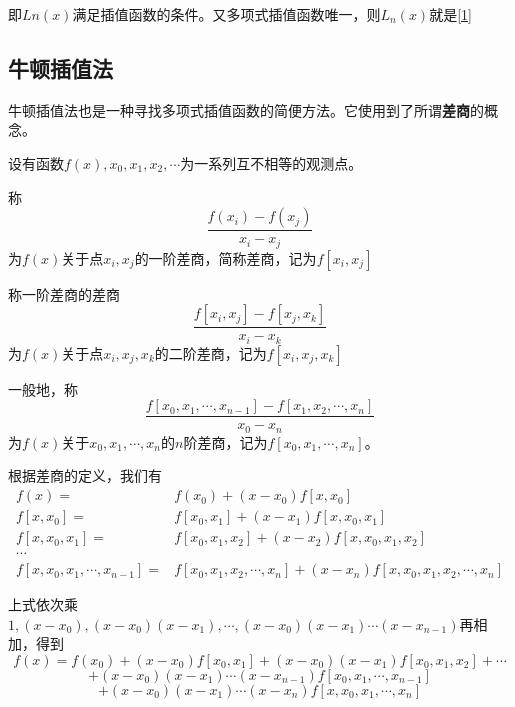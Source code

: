 \documentclass[withoutpreface]{cumcmthesis}
\begin{document}
即$Ln(x)$满足插值函数的条件。又多项式插值函数唯一，则$L_n(x)$就是\cref{1}

\subsection{牛顿插值法}

牛顿插值法也是一种寻找多项式插值函数的简便方法。它使用到了所谓\textbf{差商}的概念。

\begin{definition}[差商]
    设有函数$f(x),x_0,x_1,x_2,\cdots$为一系列互不相等的观测点。

    称\begin{equation*}
        \frac{f(x_i)-f(x_j)}{x_i-x_j}
    \end{equation*}为$f(x)$关于点$x_i,x_j$的一阶差商，简称差商，记为$f[x_i,x_j]$

    称一阶差商的差商\begin{equation*}
        \frac{f[x_i,x_j]-f[x_j,x_k]}{x_i-x_k}
    \end{equation*}为$f(x)$关于点$x_i,x_j,x_k$的二阶差商，记为$f[x_i,x_j,x_k]$

    一般地，称
    \begin{equation*}
        \frac{f[x_0,x_1,\cdots,x_{n-1}]-f[x_1,x_2,\cdots,x_n]}{x_0-x_n}
    \end{equation*}
    为$f(x)$关于$x_0,x_1,\cdots,x_n$的$n$阶差商，记为$f[x_0,x_1,\cdots,x_n]$。
\end{definition}

根据差商的定义，我们有
\begin{align*}
    f(x)=                        & f(x_0)+(x-x_0)f[x,x_0]                                       \\
    f[x,x_0]=                    & f[x_0,x_1]+(x-x_1)f[x,x_0,x_1]                               \\
    f[x,x_0,x_1]=                & f[x_0,x_1,x_2]+(x-x_2)f[x,x_0,x_1,x_2]                       \\
    \cdots                                                                                      \\
    f[x,x_0,x_1,\cdots,x_{n-1}]= & f[x_0,x_1,x_2,\cdots,x_n]+(x-x_n)f[x,x_0,x_1,x_2,\cdots,x_n]
\end{align*}

上式依次乘$1,(x-x_0),(x-x_0)(x-x_1),\cdots,(x-x_0)(x-x_1)\cdots(x-x_{n-1})$再相加，得到
\begin{equation*}
    f(x)=f(x_0)+(x-x_0)f[x_0,x_1]+(x-x_0)(x-x_1)f[x_0,x_1,x_2]+\cdots
\end{equation*}
\begin{equation*}
    +(x-x_0)(x-x_1)\cdots(x-x_{n-1})f[x_0,x_1,\cdots,x_{n-1}]
\end{equation*}
\begin{equation*}
    +(x-x_0)(x-x_1)\cdots(x-x_{n})f[x,x_0,x_1,\cdots,x_{n}]
\end{equation*}
\end{document}
